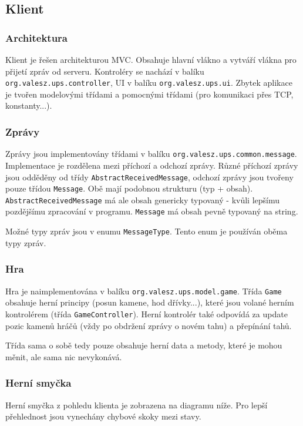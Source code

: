 \documentclass[11pt,a4paper]{scrartcl}
\begin{document}
	\subsection{Klient}
	\subsubsection{Architektura}
	Klient je řešen architekturou MVC. Obsahuje hlavní vlákno a vytváří vlákna pro přijetí zpráv od serveru. Kontroléry se nachází v balíku \verb|org.valesz.ups.controller|, UI v balíku \verb|org.valesz.ups.ui|. Zbytek aplikace je tvořen modelovými třídami a pomocnými třídami (pro komunikaci přes TCP, konstanty...).
	
	\subsubsection{Zprávy}
	Zprávy jsou implementovány třídami v balíku \verb|org.valesz.ups.common.message|. Implementace je rozdělena mezi příchozí a odchozí zprávy. Různé příchozí zprávy jsou odděděny od třídy \verb|AbstractReceivedMessage|, odchozí zprávy jsou tvořeny pouze třídou \verb|Message|. Obě mají podobnou strukturu (typ + obsah). \verb|AbstractReceivedMessage| má ale obsah genericky typovaný - kvůli lepšímu pozdějšímu zpracování v programu. \verb|Message| má obsah pevně typovaný na string.
	
	Možné typy zpráv jsou v enumu \verb|MessageType|. Tento enum je používán oběma typy zpráv.
	
	\subsubsection{Hra}
	Hra je naimplementována v balíku \verb|org.valesz.ups.model.game|. Třída \verb|Game| obsahuje herní principy (posun kamene, hod dřívky...), které jsou volané herním kontrolérem (třída \verb|GameController|). Herní kontrolér také odpovídá za update pozic kamenů hráčů (vždy po obdržení zprávy o novém tahu) a přepínání tahů.
	
	Třída sama o sobě tedy pouze obsahuje herní data a metody, které je mohou měnit, ale sama nic nevykonává.
	
		
	\subsubsection{Herní smyčka}
	Herní smyčka z pohledu klienta je zobrazena na diagramu níže. Pro lepší přehlednost jsou vynechány chybové skoky mezi stavy.
	
\end{document}
